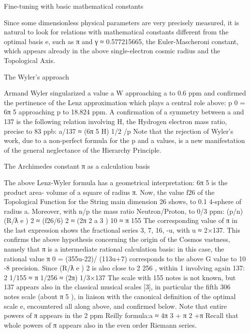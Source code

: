 Fine-tuning with basic mathematical constants

Since some dimensionless physical parameters are very precisely measured, it is natural to look for
relations with mathematical constants different from the optimal basis e, such as π and γ ≈
0.577215665, the Euler-Mascheroni constant, which appears already in the above single-electron
cosmic radius and the Topological Axis.

The Wyler's approach

Armand Wyler singularized a value a W approaching a to 0.6 ppm and confirmed the pertinence
of the Lenz approximation which plays a central role above: p 0 = 6π 5 approaching p to 18.824 ppm.
A confirmation of a symmetry between a and 137 is the following relation involving H, the
Hydrogen electron mass ratio, precise to 83 ppb:
a/137 ≈ (6π 5 H) 1/2 /p
Note that the rejection of Wyler's work, due to a non-perfect formula for the p and a values, is a new
manifestation of the general neglectance of the Hierarchy Principle.

The Archimedes constant π as a calculation basis

The above Lenz-Wyler formula has a geometrical interpretation: 6π 5 is the product area-
volume of a square of radius π. Now, the value f{26} of the Topological Function for the String
main dimension 26 shows, to 0.1 %
4-sphere of radius a. Moreover, with n/p the mass ratio Neutron/Proton, to 0/3%
ppm:
(p/n) (R/ƛ e ) 2 ≈ (f{26}/6) 2 ≈ (2π 2 a 3 ) 10 ≈ π 155
The corresponding value of π in the last expression shows the fractional series 3, 7, 16, -u, with u ≈
2×137. This confirms the above hypothesis concerning the origin of the Cosmos vastness, namely
that π is a intermediate rational calculation basis: in this case, the rational value π 0 = (355u-22)/
(113u+7) corresponds to the above G value to 10 -8 precision.
Since (R/ƛ e ) 2 is also close to 2 256 , within 1%
involving again 137:
2 1/155 ≈ π 1/256 ≈ (2π) 1/3×137
The scale with 155 notes is not known, but 137 appears also in the classical musical scales [3], in
particular the fifth 306 notes scale (about π 5 ), in liaison with the canonical definition of the optimal
scale e, encountered all along above, and confirmed below.
Note that entire powers of π appears in the 2 ppm Reilly formula:a ≈ 4π 3 + π 2 +π
Recall that whole powers of π appears also in the even order Riemann series.

